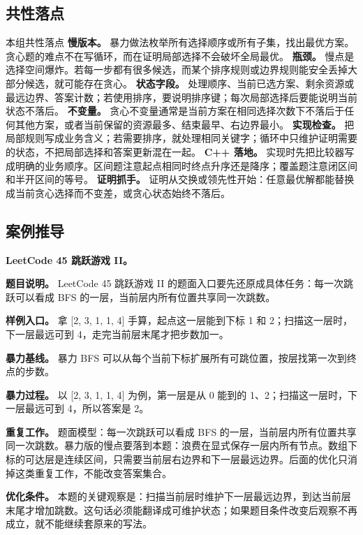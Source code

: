 \subsection{共性落点}

\begin{principlebox}{本组共性落点}
\textbf{慢版本。} 暴力做法枚举所有选择顺序或所有子集，找出最优方案。贪心题的难点不在写循环，而在证明局部选择不会破坏全局最优。
\textbf{瓶颈。} 慢点是选择空间爆炸。若每一步都有很多候选，而某个排序规则或边界规则能安全丢掉大部分候选，就可能存在贪心。
\textbf{状态字段。} 处理顺序、当前已选方案、剩余资源或最远边界、答案计数；若使用排序，要说明排序键；每次局部选择后要能说明当前状态不落后。
\textbf{不变量。} 贪心不变量通常是当前方案在相同选择次数下不落后于任何其他方案，或者当前保留的资源最多、结束最早、右边界最小。
\textbf{实现检查。} 把局部规则写成业务含义；若需要排序，就处理相同关键字；循环中只维护证明需要的状态，不把局部选择和答案更新混在一起。
\textbf{C++ 落地。} 实现时先把比较器写成明确的业务顺序。区间题注意起点相同时终点升序还是降序；覆盖题注意闭区间和半开区间的等号。
\textbf{证明抓手。} 证明从交换或领先性开始：任意最优解都能替换成当前贪心选择而不变差，或贪心状态始终不落后。
\end{principlebox}

\subsection{案例推导}

\noindent\textbf{LeetCode 45 跳跃游戏 II。}

\textbf{题目说明。} LeetCode 45 跳跃游戏 II 的题面入口要先还原成具体任务：每一次跳跃可以看成 BFS 的一层，当前层内所有位置共享同一次跳数。

\textbf{样例入口。} 拿 [2, 3, 1, 1, 4] 手算，起点这一层能到下标 1 和 2；扫描这一层时，下一层最远可到 4，走完当前层末尾才把步数加一。

\textbf{暴力基线。} 暴力 BFS 可以从每个当前下标扩展所有可跳位置，按层找第一次到终点的步数。

\textbf{暴力过程。} 以 [2, 3, 1, 1, 4] 为例，第一层是从 0 能到的 1、2；扫描这一层时，下一层最远可到 4，所以答案是 2。

\textbf{重复工作。} 题面模型：每一次跳跃可以看成 BFS 的一层，当前层内所有位置共享同一次跳数。暴力版的慢点要落到本题：浪费在显式保存一层内所有节点。数组下标的可达层是连续区间，只需要当前层右边界和下一层最远边界。后面的优化只消掉这类重复工作，不能改变答案集合。

\textbf{优化条件。} 本题的关键观察是：扫描当前层时维护下一层最远边界，到达当前层末尾才增加跳数。这句话必须能翻译成可维护状态；如果题目条件改变后观察不再成立，就不能继续套原来的写法。

